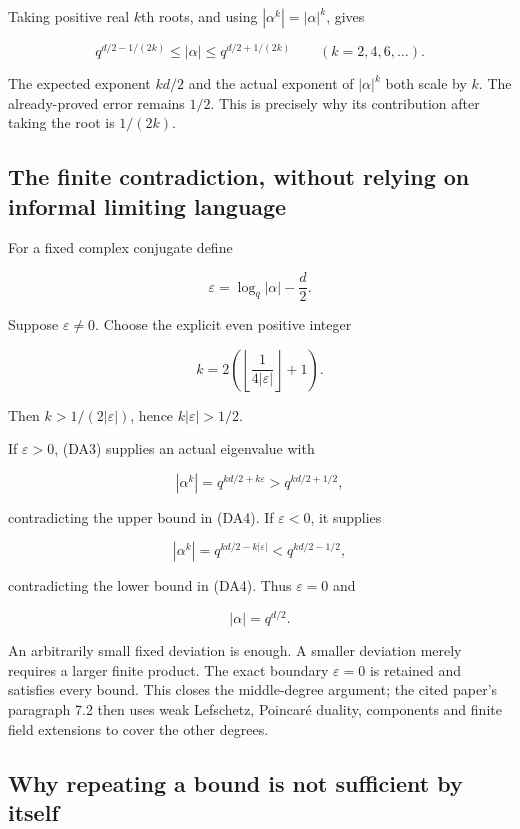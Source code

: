 Taking positive real \(k\)th roots, and using \(|\alpha^k|=|\alpha|^k\),
gives

\[q^{d/2-1/(2k)}\le |\alpha|\le q^{d/2+1/(2k)}
\qquad(k=2,4,6,\ldots).\tag{DA5}\]

The expected exponent \(kd/2\) and the actual exponent of \(|\alpha|^k\)
both scale by \(k\). The already-proved error remains \(1/2\). This is
precisely why its contribution after taking the root is \(1/(2k)\).

\subsection{The finite contradiction, without relying on informal
limiting
language}\label{the-finite-contradiction-without-relying-on-informal-limiting-language}

For a fixed complex conjugate define

\[\varepsilon=\log_q|\alpha|-\frac d2.\]

Suppose \(\varepsilon\ne0\). Choose the explicit even positive integer

\[k=2\left(\left\lfloor\frac{1}{4|\varepsilon|}\right\rfloor+1\right).
\tag{DA6}\]

Then \(k>1/(2|\varepsilon|)\), hence \(k|\varepsilon|>1/2\).

If \(\varepsilon>0\), (DA3) supplies an actual eigenvalue with

\[|\alpha^k|=q^{kd/2+k\varepsilon}>q^{kd/2+1/2},\]

contradicting the upper bound in (DA4). If \(\varepsilon<0\), it
supplies

\[|\alpha^k|=q^{kd/2-k|\varepsilon|}<q^{kd/2-1/2},\]

contradicting the lower bound in (DA4). Thus \(\varepsilon=0\) and

\[\boxed{|\alpha|=q^{d/2}.}\tag{DA7}\]

An arbitrarily small fixed deviation is enough. A smaller deviation
merely requires a larger finite product. The exact boundary
\(\varepsilon=0\) is retained and satisfies every bound. This closes the
middle-degree argument; the cited paper's paragraph 7.2 then uses weak
Lefschetz, Poincaré duality, components and finite field extensions to
cover the other degrees.

\subsection{Why repeating a bound is not sufficient by
itself}\label{why-repeating-a-bound-is-not-sufficient-by-itself}

